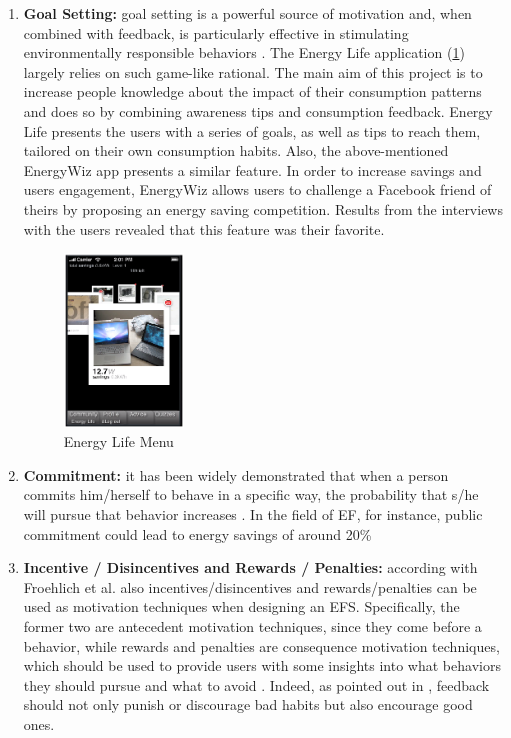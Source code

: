 \begin{enumerate}
\begin{itemize}
    \end{itemize}

\item \textbf{Goal Setting:}
goal setting is a powerful source of motivation and, when combined with feedback, is particularly effective in stimulating environmentally responsible behaviors \cite{Froehlich2010}. The Energy Life application \cite{Giulio2009}(\cref{fig:energylife}) largely relies on such game-like rational. The main aim of this project is to increase people knowledge about the impact of their consumption patterns and does so by combining awareness tips and consumption feedback. Energy Life presents the users with a series of goals, as well as tips to reach them, tailored on their own consumption habits. Also, the above-mentioned EnergyWiz app \cite{Petkov2011} presents a similar feature. In order to increase savings and users engagement, EnergyWiz allows users to challenge a Facebook friend of theirs by proposing an energy saving competition. Results from the interviews with the users revealed that this feature was their favorite. 

\begin{figure}[h]
\centering
\includegraphics[width=0.3\textwidth]{./Images/energylife}
\caption{Energy Life Menu}
\label{fig:energylife}
\end{figure}

\item \textbf{Commitment:}
it has been widely demonstrated that when a person commits him/herself to behave in a specific way, the probability that s/he will pursue that behavior increases \cite{Froehlich2010}. In the field of \ac{EF}, for instance, public commitment could lead to energy savings of around 20\% \cite{CommitmentandVoluntaryEnergyConservation}

\item \textbf{Incentive / Disincentives and Rewards / Penalties:}
according with Froehlich et al. \cite{Froehlich2010} also incentives/disincentives and rewards/penalties can be used as motivation techniques when designing an \ac{EFS}. Specifically, the former two are antecedent motivation techniques, since they come before a behavior, while rewards and penalties are consequence motivation techniques, which should be used to provide users with some insights into what behaviors they should pursue and what to avoid \cite{Froehlich2010}. Indeed, as pointed out in \cite{Giulio2009}, feedback should not only punish or discourage bad habits but also encourage good ones.


\end{enumerate}
